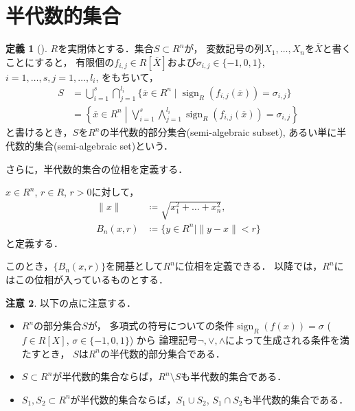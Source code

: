 \documentclass[uplatex, dvipdfmx]{jsarticle}
\numberwithin{equation}{section}
\newcommand{\norm}[1]{\| {#1} \|}
\DeclareMathOperator{\sign}{sign}
\theoremstyle{definition}
\newtheorem{definition}{定義}[section]
\newtheorem{remark}[definition]{注意}
\begin{document}
\section{半代数的集合}
\begin{definition}[{\cite[Definition 2.1.4.]{MR1659509}}]
     $R$を実閉体とする．集合$S \subset R^n$が，
     変数記号の列$X_1, \dots, X_n$を$\overline{X}$と書くことにすると，
     有限個の$f_{i,j} \in R\left[\overline{X}\right]$および$\sigma_{i,j} \in \{-1, 0 ,1\}$, $i=1, \dots, s, j = 1, \dots, l_i$, をもちいて，
     \begin{align}
          S &= \bigcup_{i=1}^s \bigcap_{j=1}^{l_i} \{\overline{x} \in R^n \mid \sign_R(f_{i,j}(\overline{x})) = \sigma_{i,j}\}\\
            &= \left\{ \overline{x} \in R^n \middle| \bigvee_{i=1}^s \bigwedge_{j=1}^{l_i} \sign_R(f_{i,j}(\overline{x})) = \sigma_{i,j} \right\}
     \end{align}
     と書けるとき，$S$を$R^n$の半代数的部分集合(semi-algebraic subset), あるい単に半代数的集合(semi-algebraic set)という．
\end{definition}

さらに，半代数的集合の位相を定義する．

$x \in R^n$, $r \in R$, $r>0$に対して，
\begin{align}
     \norm{x} &\coloneqq \sqrt{x_1^2 + \dots + x_n^2},\\
     B_n(x,r) &\coloneqq \{y \in R^n \mid \norm{y-x} < r\}
\end{align}
と定義する．

このとき，$\{B_n(x,r)\}$を開基として$R^n$に位相を定義できる．
以降では，$R^n$にはこの位相が入っているものとする．

\begin{remark}
     以下の点に注意する．
     \begin{itemize}
          \item
               $R^n$の部分集合$S$が，
               多項式の符号についての条件$\sign_R(f(x)) = \sigma$ ($f \in R[X]$, $\sigma \in \{-1, 0, 1\}$) から
               論理記号$\lnot, \lor, \land$によって生成される条件を満たすとき，
               $S$は$R^n$の半代数的部分集合である．
          \item 
               $S \subset R^n$が半代数的集合ならば，$R^n \setminus S$も半代数的集合である．
          \item 
               $S_1, S_2 \subset R^n$が半代数的集合ならば，$S_1 \cup S_2$, $S_1 \cap S_2$も半代数的集合である．
     \end{itemize}
\end{remark}
\end{document}
